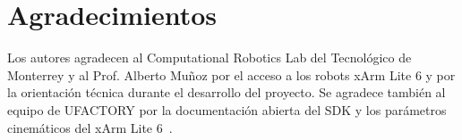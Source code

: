 \documentclass[journal,10pt,twoside]{IEEEtran}
\begin{document}
\section*{Agradecimientos}

Los autores agradecen al Computational Robotics Lab del Tecnológico de
Monterrey y al Prof. Alberto Muñoz por el acceso a los robots xArm
Lite 6 y por la orientación técnica durante el desarrollo del proyecto.
Se agradece también al equipo de UFACTORY por la documentación abierta
del SDK y los parámetros cinemáticos del xArm Lite 6~\cite{xarm_github}.

\end{document}
